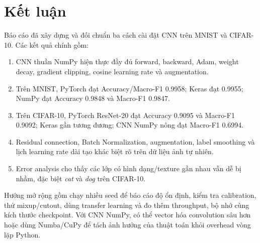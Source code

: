 \documentclass[12pt,a4paper]{report}
\begin{document}
\section{Kết luận}
Báo cáo đã xây dựng và đối chuẩn ba cách cài đặt CNN trên MNIST và CIFAR-10.
Các kết quả chính gồm:
\begin{enumerate}
    \item CNN thuần NumPy hiện thực đầy đủ forward, backward, Adam, weight decay, gradient clipping, cosine learning rate và augmentation.
    \item Trên MNIST, PyTorch đạt Accuracy/Macro-F1 0.9958; Keras đạt 0.9955; NumPy đạt Accuracy 0.9848 và Macro-F1 0.9847.
    \item Trên CIFAR-10, PyTorch ResNet-20 đạt Accuracy 0.9095 và Macro-F1 0.9092; Keras gần tương đương; CNN NumPy nông đạt Macro-F1 0.6994.
    \item Residual connection, Batch Normalization, augmentation, label smoothing và lịch learning rate dài tạo khác biệt rõ trên dữ liệu ảnh tự nhiên.
    \item Error analysis cho thấy các lớp có hình dạng/texture gần nhau vẫn dễ bị nhầm, đặc biệt \textit{cat} và \textit{dog} trên CIFAR-10.
\end{enumerate}

Hướng mở rộng gồm chạy nhiều seed để báo cáo độ ổn định, kiểm tra calibration, thử mixup/cutout, dùng transfer learning và đo thêm throughput, bộ nhớ cùng kích thước checkpoint.
Với CNN NumPy, có thể vector hóa convolution sâu hơn hoặc dùng Numba/CuPy để tách ảnh hưởng của thuật toán khỏi overhead vòng lặp Python.
\end{document}

